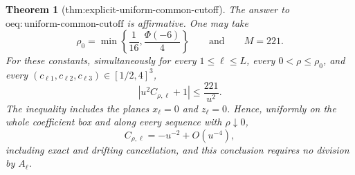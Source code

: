 \documentclass{article}
\newtheorem{theorem}{Theorem}
\begin{document}
\begin{theorem}[thm:explicit-uniform-common-cutoff]\label{thm:explicit-uniform-common-cutoff}
The answer to \(\mathrm{oeq{:}uniform\text{-}common\text{-}cutoff}\) is affirmative.  One may take
\[
\rho_0=\min\!\left\{\frac1{16},\frac{\Phi(-6)}4\right\}
\qquad\text{and}\qquad M=221.
\]
For these constants, simultaneously for every \(1\le\ell\le L\), every \(0<\rho\le\rho_0\), and every \((c_{\ell1},c_{\ell2},c_{\ell3})\in[1/2,4]^3\),
\[
\left|u^2C_{\rho,\ell}+1\right|\le\frac{221}{u^2}.
\]
The inequality includes the planes \(x_\ell=0\) and \(z_\ell=0\).  Hence, uniformly on the whole coefficient box and along every sequence with \(\rho\downarrow0\),
\[
C_{\rho,\ell}=-u^{-2}+O(u^{-4}),
\]
including exact and drifting cancellation, and this conclusion requires no division by \(A_\ell\).
\end{theorem}
\end{document}
